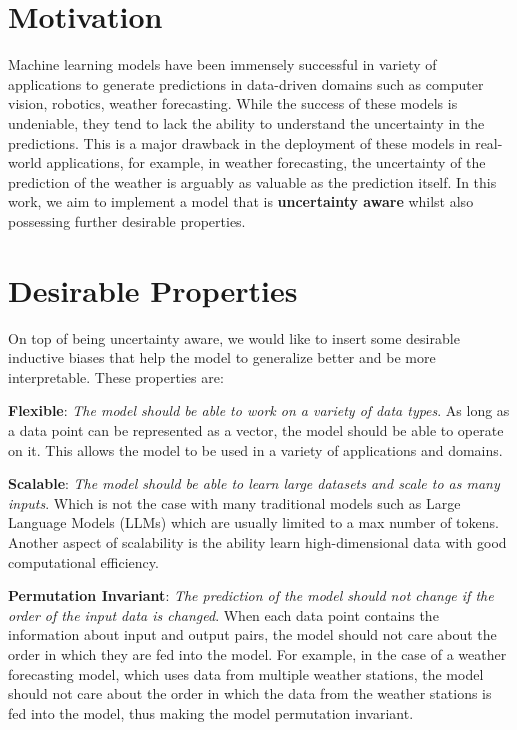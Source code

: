 \documentclass[../../main.tex]{subfiles}
\begin{document}
\section{Motivation}

Machine learning models have been immensely successful in variety of applications to generate predictions in data-driven domains such as computer vision, robotics, weather forecasting. While the success of these models is undeniable, they tend to lack the ability to understand the uncertainty in the predictions. This is a major drawback in the deployment of these models in real-world applications, for example, in weather forecasting,  the uncertainty of the prediction of the weather is arguably as valuable as the prediction itself. In this work, we aim to implement a model that is \textbf{uncertainty aware} whilst also possessing further desirable properties.

\section{Desirable Properties}

On top of being uncertainty aware, we would like to insert some desirable inductive biases that help the model to generalize better and be more interpretable. These properties are:

\textbf{Flexible}: \emph{The model should be able to work on a variety of data types}. As long as a data point can be represented as a vector, the model should be able to operate on it. This allows the model to be used in a variety of applications and domains.

\textbf{Scalable}: \emph{The model should be able to learn large datasets and scale to as many inputs}. Which is not the case with many traditional models such as Large Language Models (LLMs) which are usually limited to a max number of tokens. Another aspect of scalability is the ability learn high-dimensional data with good computational efficiency.


\textbf{Permutation Invariant}: \emph{The prediction of the model should not change if the order of the input data is changed}. When each data point contains the information about input and output pairs, the model should not care about the order in which they are fed into the model. For example, in the case of a weather forecasting model, which uses data from multiple weather stations, the model should not care about the order in which the data from the weather stations is fed into the model, thus making the model permutation invariant.
\end{document}
